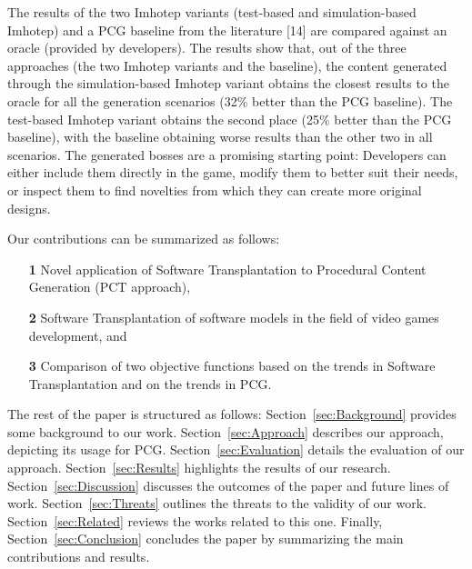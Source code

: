The results of the two Imhotep variants (test-based and simulation-based Imhotep) and a PCG baseline from the literature [14] are compared against an oracle (provided by developers). The results show that, out of the three approaches (the two Imhotep variants and the baseline), the content generated through the simulation-based Imhotep variant obtains the closest results to the oracle for all the generation scenarios (32\% better than the PCG baseline). The test-based Imhotep variant obtains the second place (25\% better than the PCG baseline), with the baseline obtaining worse results than the other two in all scenarios. The generated bosses are a promising starting point: Developers can either include them directly in the game, modify them to better suit their needs, or inspect them to find novelties from which they can create more original designs.

Our contributions can be summarized as follows:
\begin{itemize}
    \item[\textbf{1}] Novel application of Software Transplantation to Procedural Content Generation (PCT approach),
    \item[\textbf{2}] Software Transplantation of software models in the field of video games development, and
    \item[\textbf{3}] Comparison of two objective functions based on the trends in Software Transplantation and on the trends in PCG.
\end{itemize}

The rest of the paper is structured as follows: Section~\ref{sec:Background} provides some background to   our work. Section~\ref{sec:Approach} describes our approach, depicting its usage for PCG. Section~\ref{sec:Evaluation} details the evaluation of our approach. Section~\ref{sec:Results} highlights the results of our research. Section~\ref{sec:Discussion} discusses the outcomes of the paper and future lines of work. Section~\ref{sec:Threats} outlines the threats to the validity of our work. Section~\ref{sec:Related} reviews the works related to this one. Finally, 
Section~\ref{sec:Conclusion} concludes the paper by summarizing the main contributions and results.